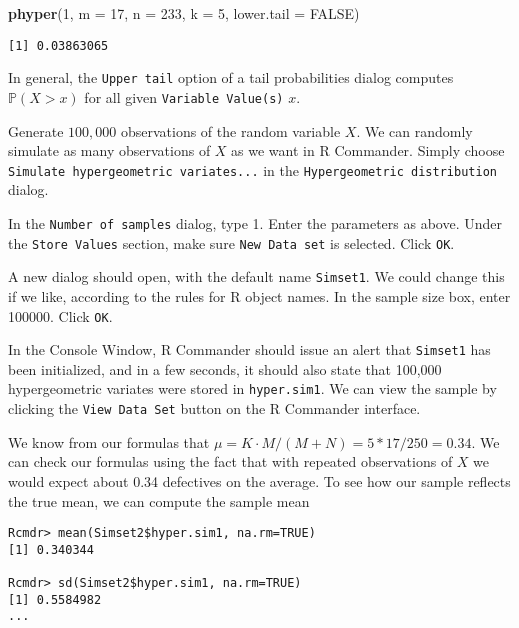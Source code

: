 \documentclass[]{book}
\newenvironment{Shaded}{\begin{snugshade}}{\end{snugshade}}
\newcommand{\KeywordTok}[1]{\textcolor[rgb]{0.13,0.29,0.53}{\textbf{{#1}}}}
\newcommand{\DataTypeTok}[1]{\textcolor[rgb]{0.13,0.29,0.53}{{#1}}}
\newcommand{\DecValTok}[1]{\textcolor[rgb]{0.00,0.00,0.81}{{#1}}}
\newcommand{\OtherTok}[1]{\textcolor[rgb]{0.56,0.35,0.01}{{#1}}}
\newcommand{\NormalTok}[1]{{#1}}
\numberwithin{equation}{chapter}
\numberwithin{figure}{chapter}
\theoremstyle{plain}
\theoremstyle{definition}
\theoremstyle{remark}
\theoremstyle{definition}
\theoremstyle{definition}
\theoremstyle{remark}
\begin{document}
\begin{Shaded}
\begin{Highlighting}[]
\KeywordTok{phyper}\NormalTok{(}\DecValTok{1}\NormalTok{, }\DataTypeTok{m =} \DecValTok{17}\NormalTok{, }\DataTypeTok{n =} \DecValTok{233}\NormalTok{, }\DataTypeTok{k =} \DecValTok{5}\NormalTok{, }\DataTypeTok{lower.tail =} \OtherTok{FALSE}\NormalTok{)}
\end{Highlighting}
\end{Shaded}

\begin{verbatim}
[1] 0.03863065
\end{verbatim}

In general, the \texttt{Upper\ tail} option of a tail probabilities
dialog computes \(\mathbb{P}(X > x)\) for all given
\texttt{Variable\ Value(s)} \(x\).

Generate \(100,000\) observations of the random variable \(X\). We can
randomly simulate as many observations of \(X\) as we want in R
Commander. Simply choose \texttt{Simulate\ hypergeometric\ variates...}
in the \texttt{Hypergeometric\ distribution} dialog.

In the \texttt{Number\ of\ samples} dialog, type 1. Enter the parameters
as above. Under the \texttt{Store\ Values} section, make sure
\texttt{New\ Data\ set} is selected. Click \texttt{OK}.

A new dialog should open, with the default name \texttt{Simset1}. We
could change this if we like, according to the rules for R object names.
In the sample size box, enter 100000. Click \texttt{OK}.

In the Console Window, R Commander should issue an alert that
\texttt{Simset1} has been initialized, and in a few seconds, it should
also state that 100,000 hypergeometric variates were stored in
\texttt{hyper.sim1}. We can view the sample by clicking the
\texttt{View\ Data\ Set} button on the R Commander interface.

We know from our formulas that \(\mu=K\cdot M/(M+N)=5*17/250=0.34\). We
can check our formulas using the fact that with repeated observations of
\(X\) we would expect about 0.34 defectives on the average. To see how
our sample reflects the true mean, we can compute the sample mean

\begin{verbatim}
Rcmdr> mean(Simset2$hyper.sim1, na.rm=TRUE)
[1] 0.340344

Rcmdr> sd(Simset2$hyper.sim1, na.rm=TRUE)
[1] 0.5584982
...
\end{verbatim}
\end{document}

